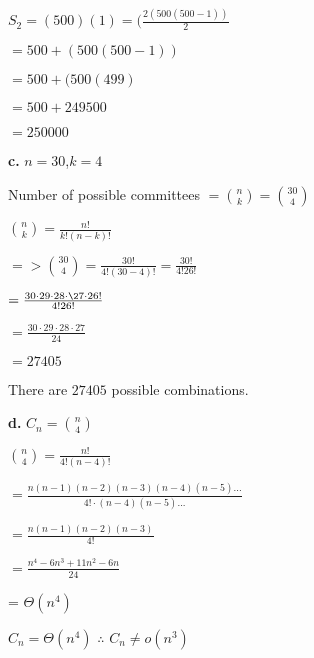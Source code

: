 \documentclass[12pt,letterpaper,final]{report}
\begin{document}
\bigskip

\quad $S_2 = (500)(1) = (\frac{2(500(500-1))}{2}$

\quad $= 500 + (500(500 - 1))$

\quad $= 500 + (500(499)$

\quad $= 500 + 249500$

\quad $= 250000$

\bigskip

\textbf{c.} $n = 30$,\space $k = 4$

\quad Number of possible committees $ = \binom{n}{k} = \binom{30}{4}$

\quad $\binom{n}{k} = \frac{n!}{k!(n-k)!}$

\quad  $=> \binom{30}{4} = \frac{30!}{4!(30-4)!} = \frac{30!}{4!26!}$

\quad

\quad $= \frac{30\cdot29\cdot28\cdot\27\cdot26!}{4!26!}$

\quad

\quad $= \frac{30\cdot29\cdot28\cdot27}{24}$

\quad $= 27405$

\quad There are $27405$ possible combinations.

\bigskip

\textbf{d.} $C_n = \binom{n}{4}$

\quad $\binom{n}{4} = \frac{n!}{4!(n-4)!}$

\quad $= \frac{n(n-1)(n-2)(n-3)(n-4)(n-5)...}{4!\cdot(n-4)(n-5)...}$

\quad $= \frac{n(n-1)(n-2)(n-3)}{4!}$

\quad $=\frac{n^4-6n^3+11n^2-6n}{24}$

\quad = $\Theta(n^4)$









\quad $C_n = \Theta(n^4)$ \space $\therefore$ \space $C_n \neq o(n^3)$ 
\end{document}
